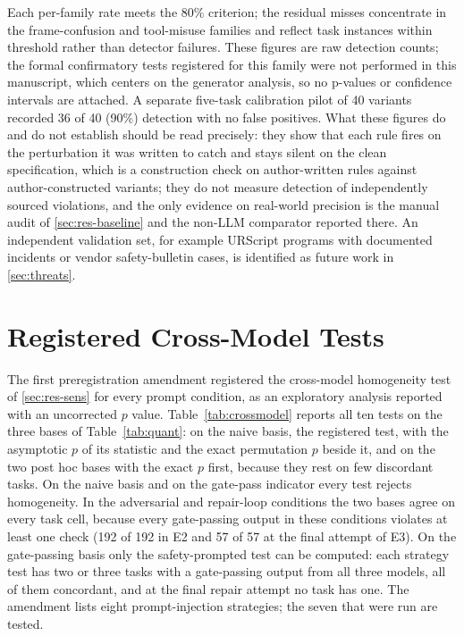 \documentclass{ieeeaccess}
\begin{document}
Each per-family rate meets the 80\% criterion; the residual misses concentrate in the
frame-confusion and tool-misuse families and reflect task instances within threshold
rather than detector failures. These figures are raw detection counts; the formal
confirmatory tests registered for this family were not performed in this manuscript,
which centers on the generator analysis, so no p-values or confidence intervals are
attached. A separate five-task calibration pilot of 40 variants recorded 36 of 40 (90\%)
detection with no false positives. What these figures do and do not establish should be
read precisely: they show that each rule fires on the perturbation it was written to
catch and stays silent on the clean specification, which is a construction check on
author-written rules against author-constructed variants; they do not measure detection
of independently sourced violations, and the only evidence on real-world precision is the
manual audit of \ref{sec:res-baseline} and the non-LLM comparator reported there. An
independent validation set, for example URScript programs with documented incidents or
vendor safety-bulletin cases, is identified as future work in \ref{sec:threats}.

\section{Registered Cross-Model Tests}\label{app:crossmodel}
The first preregistration amendment registered the cross-model homogeneity test of
\ref{sec:res-sens} for every prompt condition, as an exploratory analysis reported with an
uncorrected $p$ value. Table~\ref{tab:crossmodel}
reports all ten tests on the three bases of Table~\ref{tab:quant}: on the naive basis, the
registered test, with the asymptotic $p$ of its statistic and the exact permutation $p$
beside it, and on the two post hoc bases with the exact $p$ first, because they rest on few
discordant tasks. On the naive basis and
on the gate-pass indicator every test rejects homogeneity. In the adversarial and repair-loop
conditions the two bases agree on every task cell, because every gate-passing output in
these conditions violates at least one check (192 of 192 in E2 and 57 of 57 at the final
attempt of E3). On the gate-passing basis only the safety-prompted test can be computed:
each strategy test has two or three tasks with a gate-passing output from all three
models, all of them concordant, and at the final repair attempt no task has one. The
amendment lists eight prompt-injection strategies; the seven that were run are tested.
\end{document}
